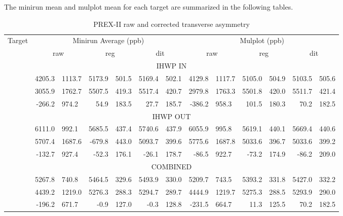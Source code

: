 The minirun mean and mulplot mean for each target are summarized in the following
tables.
\begin{table}[!h]
    \scriptsize
    \begin{tabular}{c | r@{ $\pm$ }l r@{ $\pm$ }l r@{ $\pm$ }l | r@{ $\pm$ }l r@{ $\pm$ }l r@{ $\pm$ }l}
	\hline
	\multirow{2}{*}{Target}	& \multicolumn{6}{c|}{Minirun Average (ppb)} & \multicolumn{6}{c}{Mulplot (ppb)}	\\
	\cline{2-13}
	    & \multicolumn{2}{c}{raw}   & \multicolumn{2}{c}{reg}	& \multicolumn{2}{c|}{dit}   & \multicolumn{2}{c}{raw}	& \multicolumn{2}{c}{reg}   & \multicolumn{2}{c}{dit}	\\
	\hline
	\multicolumn{13}{c}{IHWP IN}   \\
	\hline
	\C	& 4205.3	& 1113.7    & 5173.9	& 501.5	    & 5169.4	& 502.1	    & 4129.8  & 1117.7    & 5105.0  & 504.9     & 5103.5  & 505.6   \\ 
	\ca	& 3055.9	& 1762.7    & 5507.5	& 419.3     & 5517.4	& 420.7	    & 2979.8  & 1763.3    & 5501.8  & 420.0     & 5511.7  & 421.4   \\   
	\Pb	& -266.2	& 974.2     & 54.9  	& 183.5     & 27.7  	& 185.7	    & -386.2  & 958.3     & 101.5   & 180.3     & 70.2    & 182.5   \\   
	\hline
	\multicolumn{13}{c}{IHWP OUT}   \\
	\hline
	\C	& 6111.0	& 992.1	    & 5685.5	& 437.4	    & 5740.6	& 437.9	    & 6055.9  & 995.8     & 5619.1  & 440.1     & 5669.4  & 440.6   \\ 
	\ca	& 5707.4	& 1687.6    & -679.8	& 443.0     & 5093.7	& 399.6	    & 5775.6  & 1687.8    & 5033.6  & 396.7     & 5033.6  & 399.2   \\   
	\Pb	& -132.7	& 927.4     & -52.3 	& 176.1     & -26.1 	& 178.7	    & -86.5   & 922.7     & -73.2   & 174.9     & -86.2   & 209.0   \\   
	\hline
	\multicolumn{13}{c}{COMBINED}   \\
	\hline
	\C	& 5267.8	& 740.8	    & 5464.5	& 329.6	    & 5493.9	& 330.0	    & 5209.7  & 743.5     & 5393.2  & 331.8     & 5427.0  & 332.2   \\ 
	\ca	& 4439.2	& 1219.0    & 5276.3	& 288.3     & 5294.7	& 289.7	    & 4444.9  & 1219.7    & 5275.3  & 288.5     & 5293.9  & 290.0   \\   
	\Pb	& -196.2	& 671.7     & -0.9  	& 127.0     & -0.3  	& 128.8	    & -231.5  & 664.7     & 11.3    & 125.5     & 70.2    & 182.5   \\   
	\hline
    \end{tabular}
    \caption{PREX-II raw and corrected transverse asymmetry}
\end{table}

